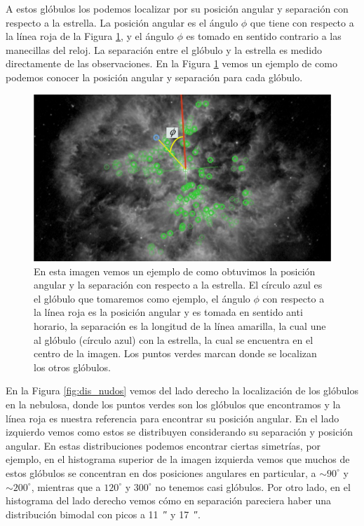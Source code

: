 \documentclass{book}
\begin{document}
A estos glóbulos los podemos localizar por su posición angular y separación con respecto a la estrella. La posición angular es el ángulo $\phi$ que tiene con respecto a la línea roja de la Figura \ref{fig:ejemplo_PA_Sep}, y el ángulo $\phi$ es tomado en sentido contrario a las manecillas del reloj. La separación entre el glóbulo y la estrella es medido directamente de las observaciones. En la Figura \ref{fig:ejemplo_PA_Sep} vemos un ejemplo de como podemos conocer la posición angular y separación para cada glóbulo.

\begin{figure}[htb]
    \centering
    \includegraphics[width=\textwidth]{ultimos/ejemplo_phi.pdf}
    \caption{En esta imagen vemos un ejemplo de como obtuvimos la posición angular y la separación con respecto a la estrella. El círculo azul es el glóbulo que tomaremos como ejemplo, el ángulo $\phi$ con respecto a la línea roja es la posición angular y es tomada en sentido anti horario, la separación es la longitud de la línea amarilla, la cual une al glóbulo (círculo azul) con la estrella, la cual se encuentra en el centro de la imagen. Los puntos verdes marcan donde se localizan los otros glóbulos.}
    \label{fig:ejemplo_PA_Sep}
\end{figure}

En la Figura \ref{fig:dis_nudos} vemos del lado derecho la localización de los glóbulos en la nebulosa, donde los puntos verdes son los glóbulos que encontramos y la línea roja es nuestra referencia para encontrar su posición angular. En el lado izquierdo vemos como estos se distribuyen considerando su separación y posición angular. En estas distribuciones podemos encontrar ciertas simetrías, por ejemplo, en el histograma superior de la imagen izquierda vemos que muchos de estos glóbulos se concentran en dos posiciones angulares en particular, a $\sim90^\circ$ y $\sim200^\circ$, mientras que a $120^\circ$ y $300^\circ$ no tenemos casi glóbulos. Por otro lado, en el histograma del lado derecho vemos cómo en separación pareciera haber una distribución bimodal con picos a \SI{11}{\arcsecond} y \SI{17}{\arcsecond}.
\end{document}
